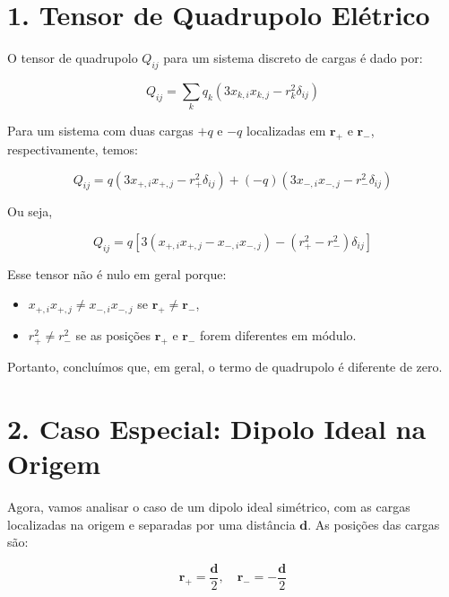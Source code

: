 \documentclass[a4paper,12pt]{article}
\begin{document}
\begin{flushleft}
\section*{1. Tensor de Quadrupolo Elétrico}

O tensor de quadrupolo \( Q_{ij} \) para um sistema discreto de cargas é dado por:

\begin{equation}
\boxed{
Q_{ij} = \sum_k q_k \left( 3 x_{k,i} x_{k,j} - r_k^2 \delta_{ij} \right)
}
\end{equation}

Para um sistema com duas cargas \( +q \) e \( -q \) localizadas em \( \mathbf{r}_+ \) e \( \mathbf{r}_- \), respectivamente, temos:

\begin{equation}
Q_{ij} = q \left( 3 x_{+,i} x_{+,j} - r_+^2 \delta_{ij} \right) + (-q) \left( 3 x_{-,i} x_{-,j} - r_-^2 \delta_{ij} \right)
\end{equation}

Ou seja,

\begin{equation}
\boxed{Q_{ij} = q \left[ 3(x_{+,i} x_{+,j} - x_{-,i} x_{-,j}) - (r_+^2 - r_-^2)\delta_{ij} \right]}
\end{equation}

Esse \colorbox{green!15}{tensor não é nulo em geral} porque:

\begin{itemize}
    \item \( x_{+,i} x_{+,j} \neq x_{-,i} x_{-,j} \) se \( \mathbf{r}_+ \neq \mathbf{r}_- \),
    \item \( r_+^2 \neq r_-^2 \) se as posições \( \mathbf{r}_+ \) e \( \mathbf{r}_- \) forem diferentes em módulo.
\end{itemize}

Portanto, concluímos que, em geral, o \colorbox{red!15}{termo de quadrupolo é diferente de zero}.

\section*{2. Caso Especial: Dipolo Ideal na Origem}

Agora, vamos analisar o caso de um \colorbox{yellow!25}{dipolo ideal} simétrico, com as cargas 
localizadas na origem e separadas por uma distância \( \mathbf{d} \). As posições das cargas são:

\begin{equation}
\mathbf{r}_+ = \frac{\mathbf{d}}{2}, \quad \mathbf{r}_- = -\frac{\mathbf{d}}{2}
\end{equation}


\end{flushleft}
\end{document}
